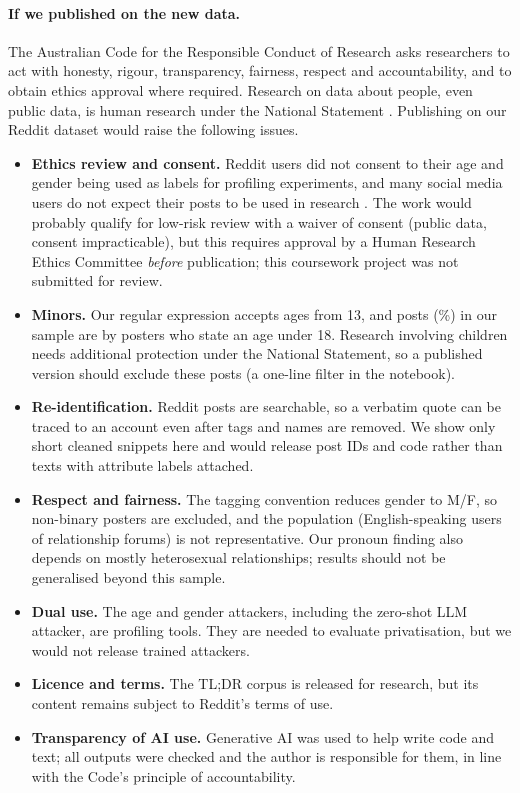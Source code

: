 \documentclass[11pt]{article}
\begin{document}
\paragraph{If we published on the new data.} The Australian Code for the Responsible Conduct of Research \citep{nhmrc2018code} asks researchers to act with honesty, rigour, transparency, fairness, respect and accountability, and to obtain ethics approval where required. Research on data about people, even public data, is human research under the National Statement \citep{nhmrc2023national}. Publishing on our Reddit dataset would raise the following issues.
\begin{itemize}
\setlength\itemsep{0pt}
\item \textbf{Ethics review and consent.} Reddit users did not consent to their age and gender being used as labels for profiling experiments, and many social media users do not expect their posts to be used in research \citep{fiesler2018participant}. The work would probably qualify for low-risk review with a waiver of consent (public data, consent impracticable), but this requires approval by a Human Research Ethics Committee \emph{before} publication; this coursework project was not submitted for review.
\item \textbf{Minors.} Our regular expression accepts ages from 13, and \NMinor{} posts (\PctMinor\%) in our sample are by posters who state an age under 18. Research involving children needs additional protection under the National Statement, so a published version should exclude these posts (a one-line filter in the notebook).
\item \textbf{Re-identification.} Reddit posts are searchable, so a verbatim quote can be traced to an account even after tags and names are removed. We show only short cleaned snippets here and would release post IDs and code rather than texts with attribute labels attached.
\item \textbf{Respect and fairness.} The tagging convention reduces gender to M/F, so non-binary posters are excluded, and the population (English-speaking users of relationship forums) is not representative. Our pronoun finding also depends on mostly heterosexual relationships; results should not be generalised beyond this sample.
\item \textbf{Dual use.} The age and gender attackers, including the zero-shot LLM attacker, are profiling tools. They are needed to evaluate privatisation, but we would not release trained attackers.
\item \textbf{Licence and terms.} The TL;DR corpus is released for research, but its content remains subject to Reddit's terms of use.
\item \textbf{Transparency of AI use.} Generative AI was used to help write code and text; all outputs were checked and the author is responsible for them, in line with the Code's principle of accountability.
\end{itemize}
\end{document}
